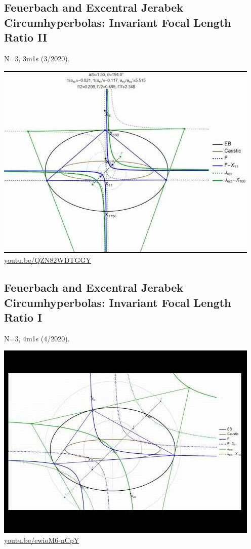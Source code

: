 \documentclass[12pt]{amsart}
\begin{document}
\subsection{Feuerbach and Excentral Jerabek Circumhyperbolas: Invariant Focal Length Ratio II}
\label{vid:QZN82WDTGGY}
\noindent N=3, 3m1s (3/2020). 
\begin{center}\includegraphics[width=.5\textwidth]{pics/QZN82WDTGGY.jpg} \\ 
\href{https://youtu.be/QZN82WDTGGY}{\url{youtu.be/QZN82WDTGGY}}\end{center}
% 

\subsection{Feuerbach and Excentral Jerabek Circumhyperbolas: Invariant Focal Length Ratio I}
\label{vid:ewioM6-nCpY}
\noindent N=3, 4m1s (4/2020). 
\begin{center}\includegraphics[width=.5\textwidth]{pics/ewioM6-nCpY.jpg} \\ 
\href{https://youtu.be/ewioM6-nCpY}{\url{youtu.be/ewioM6-nCpY}}\end{center}
% 
\end{document}
